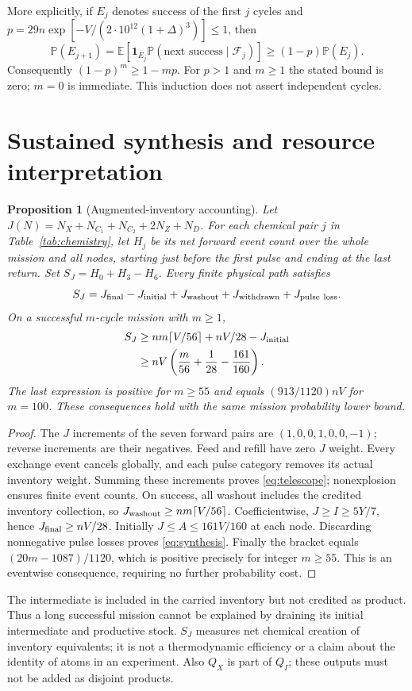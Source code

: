 \documentclass[11pt]{article}
\newtheorem{proposition}[theorem]{Proposition}
\theoremstyle{definition}\newtheorem{definition}[theorem]{Definition}
\newcommand{\Law}{\mathbb P}
\begin{document}
More explicitly, if $E_j$ denotes success of the first $j$ cycles and
$p=29n\exp[-V/(2\cdot10^{12}(1+\Delta)^3)]\le1$, then
\[
\Law(E_{j+1})=\mathbb E\!\left[\mathbf1_{E_j}
  \Law(\text{next success}\mid\mathcal F_j)\right]
\ge(1-p)\Law(E_j).
\]
Consequently $(1-p)^m\ge1-mp$. For $p>1$ and $m\ge1$ the stated bound is zero;
$m=0$ is immediate. This induction does not assert independent cycles.

\section{Sustained synthesis and resource interpretation}
\begin{proposition}[Augmented-inventory accounting]\label{prop:synthesis}
Let $J(N)=N_X+N_{C_1}+N_{C_2}+2N_Z+N_D$. For each chemical pair $j$ in
Table~\ref{tab:chemistry}, let $H_j$ be its net forward event count over the whole
mission and all nodes, starting just before the first pulse and ending at the last
return. Set $S_J=H_0+H_3-H_6$. Every finite physical path satisfies
\begin{equation}\label{eq:telescope}
S_J=J_{\rm final}-J_{\rm initial}+J_{\rm washout}
       +J_{\rm withdrawn}+J_{\rm pulse\ loss}.
\end{equation}
On a successful $m$-cycle mission with $m\ge1$,
\begin{align}
S_J&\ge nm\lceil V/56\rceil+nV/28-J_{\rm initial}\notag\\
&\ge nV\left(\frac m{56}+\frac1{28}-\frac{161}{160}\right).
\label{eq:synthesis}
\end{align}
The last expression is positive for $m\ge55$ and equals $(913/1120)nV$ for $m=100$.
These consequences hold with the same mission probability lower bound.
\end{proposition}
\begin{proof}
The $J$ increments of the seven forward pairs are $(1,0,0,1,0,0,-1)$;
reverse increments are their negatives. Feed and refill have zero $J$ weight.
Every exchange event cancels globally, and each pulse category removes its actual
inventory weight. Summing these increments proves \eqref{eq:telescope}; nonexplosion
ensures finite event counts. On success, all washout includes the credited inventory
collection, so $J_{\rm washout}\ge nm\lceil V/56\rceil$. Coefficientwise,
$J\ge I\ge5Y/7$, hence $J_{\rm final}\ge nV/28$. Initially $J\le A\le161V/160$
at each node. Discarding nonnegative pulse losses proves \eqref{eq:synthesis}.
Finally the bracket equals $(20m-1087)/1120$, which is positive precisely for
integer $m\ge55$. This is an eventwise consequence, requiring no further probability cost.
\end{proof}
The intermediate is included in the carried inventory but not credited as product.
Thus a long successful mission cannot be explained by draining its initial intermediate
and productive stock. $S_J$ measures net chemical creation of inventory equivalents;
it is not a thermodynamic efficiency or a claim about the identity of atoms in an
experiment. Also $Q_X$ is part of $Q_I$; these outputs must not be added as disjoint products.
\end{document}
